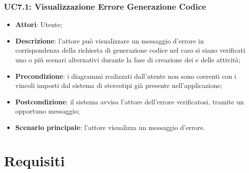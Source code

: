 \subsubsection{UC7.1: Visualizzazione Errore Generazione Codice}
\label{UC7.1}
\begin{itemize}
	\item \textbf{Attori}: Utente;
	\item \textbf{Descrizione}: l'attore può visualizzare un messaggio d'errore in corrispondenza della richiesta di generazione codice nel caso si siano verificati uno o più scenari alternativi durante la fase di creazione dei  e delle attività;
	\item \textbf{Precondizione}: i diagrammi realizzati dall'utente non sono coerenti con i vincoli imposti dal sistema di stereotipi già presente nell'applicazione;
	\item \textbf{Postcondizione}: il sistema avvisa l'attore dell'errore verificatosi, tramite un opportuno messaggio;
	\item \textbf{Scenario principale}: l'attore visualizza un messaggio d'errore.
\end{itemize}




\section{Requisiti}

